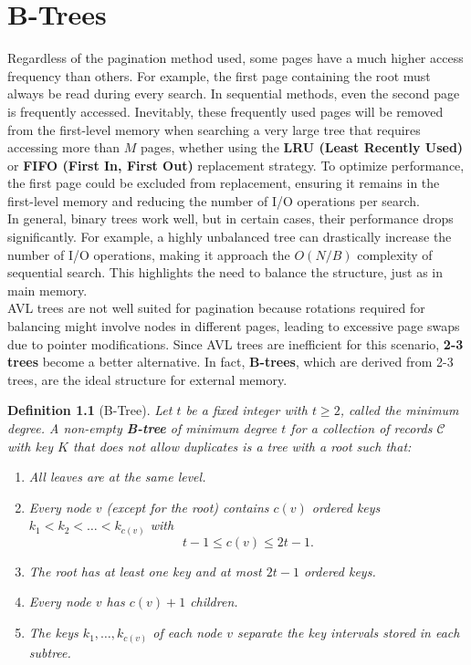 \documentclass{report}
\newtheorem{defin}{Definition}[chapter]
\begin{document}
\chapter{B-Trees}
Regardless of the pagination method used, some pages have a much higher access frequency than others. For example, the first page containing the root must always be read during every search. In sequential methods, even the second page is frequently accessed. Inevitably, these frequently used pages will be removed from the first-level memory when searching a very large tree that requires accessing more than \( M \) pages, whether using the \textbf{LRU (Least Recently Used)} or \textbf{FIFO (First In, First Out)} replacement strategy. To optimize performance, the first page could be excluded from replacement, ensuring it remains in the first-level memory and reducing the number of I/O operations per search.  
\\In general, binary trees work well, but in certain cases, their performance drops significantly. For example, a highly unbalanced tree can drastically increase the number of I/O operations, making it approach the \( O(N/B) \) complexity of sequential search. This highlights the need to balance the structure, just as in main memory.  
\\AVL trees are not well suited for pagination because rotations required for balancing might involve nodes in different pages, leading to excessive page swaps due to pointer modifications. Since AVL trees are inefficient for this scenario, \textbf{2-3 trees} become a better alternative. In fact, \textbf{B-trees}, which are derived from 2-3 trees, are the ideal structure for external memory.
\begin{defin}[B-Tree]
Let \( t \) be a fixed integer with \( t \geq 2 \), called the \textit{minimum degree}.  
A non-empty \textbf{B-tree} of minimum degree \( t \) for a collection of records \(\mathcal{C}\) with key \( K \) that does not allow duplicates is a tree with a root such that:  
\begin{enumerate}
    \item All leaves are at the same level.
    \item Every node \( v \) (except for the root) contains \( c(v) \) ordered keys \( k_1 < k_2 < \dots < k_{c(v)} \) with  
          \begin{equation}
            t -1 \leq c(v) \leq 2t -1.
          \end{equation}
    \item The root has at least one key and at most \( 2t -1 \) ordered keys.
    \item Every node \( v \) has \( c(v) +1 \) children.
    \item The keys \( k_1, \dots, k_{c(v)} \) of each node \( v \) separate the key intervals stored in each subtree.
\end{enumerate}
\end{defin}
\end{document}
